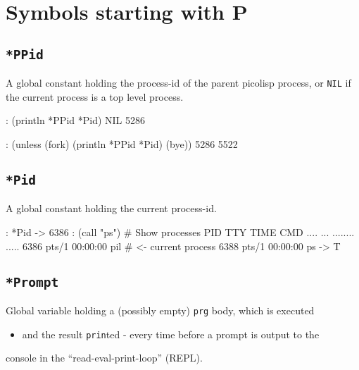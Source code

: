 %
%
%



\chapter{Symbols starting with P}
\label{cha:func-ref-P-functions-starting-with-P}
 
\section*{\texttt{*PPid}}
\label{sec:func-ref-P-*PPid}


A global constant holding the process-id of the parent picolisp process,
or \texttt{NIL} if the current process is a top level process.


\begin{wideverbatim}
: (println *PPid *Pid)
NIL 5286

: (unless (fork) (println *PPid *Pid) (bye))
5286 5522
\end{wideverbatim}

 
\section*{\texttt{*Pid}}
\label{sec:func-ref-P-*Pid}


A global constant holding the current process-id.


\begin{wideverbatim}
: *Pid
-> 6386
: (call "ps")  # Show processes
  PID TTY          TIME CMD
 .... ...      ........ .....
 6386 pts/1    00:00:00 pil   # <- current process
 6388 pts/1    00:00:00 ps
-> T
\end{wideverbatim}

 
\section*{\texttt{*Prompt}}
\label{sec:func-ref-P-*Prompt}


Global variable holding a (possibly empty) \texttt{prg} body, which is executed
\begin{itemize}
\item and the result \texttt{prin}ted - every time before a prompt is output to the
\end{itemize}
console in the ``read-eval-print-loop'' (REPL).


